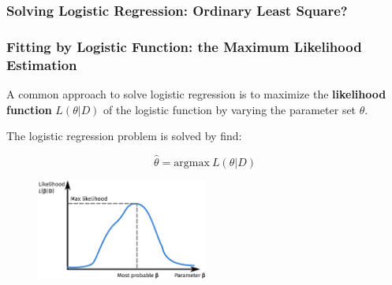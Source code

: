 \documentclass[10pt,aspectratio=169]{beamer}
\begin{document}
\begin{frame}
\begin{columns}[T]
\begin{column}{0.5\textwidth}
      \end{column}
      
    \end{columns}
  \end{frame}

  \begin{frame}
    \frametitle{Solving Logistic Regression: Ordinary Least Square?}
    
  \end{frame}

  \begin{frame}
    \frametitle{Fitting by Logistic Function: the Maximum Likelihood Estimation}

    A common approach to solve logistic regression is to maximize the
    \textbf{likelihood function} $L(\theta|D)$ of the logistic function by varying the
    parameter set $\theta$.

    The logistic regression problem is solved by find:

    \begin{equation*}
      \hat{\theta} = \mathrm{argmax}\ L(\theta|D)
    \end{equation*}
    
         \begin{figure}[t]
           \includegraphics[width=0.5\textwidth]{images/likelihood.pdf}
         \end{figure}

    
  \end{frame}
\end{document}
